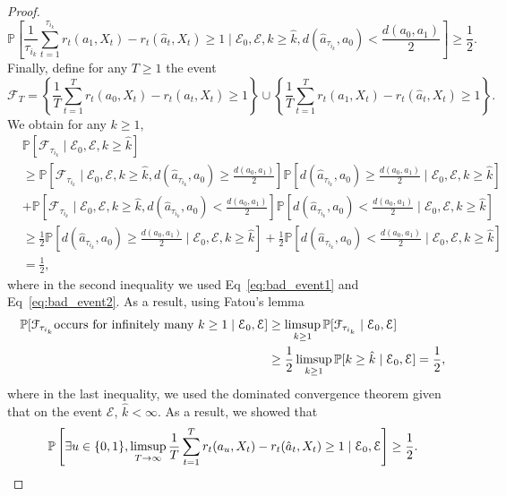 \documentclass[aos]{imsart}
\theoremstyle{plain}
\theoremstyle{remark}
\newcommand{\Ecal}{\mathcal{E}}
\newcommand{\Fcal}{\mathcal{F}}
\newcommand{\Pbb}{\mathbb{P}}
\newcommand{\1}{\mathbbm{1}}%
\renewcommand{\limsup}{\mathop{\rm limsup}}
\begin{document}
\begin{proof}
\begin{equation}\label{eq:bad_event2}
    \Pbb \left[\frac{1}{\tau_{i_k}}\sum_{t=1}^{\tau_{i_k}} r_t(a_1, X_t) - r_t(\hat a_t, X_t) \geq 1 \mid \Ecal_0,\Ecal, k\geq \hat k,d(\hat a_{\tau_{i_k}},a_0) < \frac{d(a_0,a_1)}{2} \right] \geq \frac{1}{2}.
\end{equation}
Finally, define for any $T\geq 1$ the event
\begin{equation*}
    \Fcal_T = \left\{ \frac{1}{T}\sum_{t=1}^T r_t(a_0, X_t) -r_t(\hat a_t, X_t) \geq 1\right\} \cup \left\{\frac{1}{T}\sum_{t=1}^{T} r_t(a_1, X_t) - r_t(\hat a_t, X_t) \geq 1\right\}.
\end{equation*}
We obtain for any $k\geq 1$,
\begin{align*}
    &\Pbb[\Fcal_{\tau_{i_k}}\mid \Ecal_0,\Ecal, k\geq \hat k]\\
    &\geq \Pbb\left[\Fcal_{\tau_{i_k}}\mid \Ecal_0,\Ecal, k\geq \hat k, d(\hat a_{\tau_{i_k}},a_0) \geq \frac{d(a_0,a_1)}{2}\right] \Pbb\left[ d(\hat a_{\tau_{i_k}},a_0) \geq \frac{d(a_0,a_1)}{2}\mid \Ecal_0,\Ecal, k\geq \hat k\right]\\
    &+ \Pbb\left[\Fcal_{\tau_{i_k}}\mid \Ecal_0,\Ecal, k\geq \hat k, d(\hat a_{\tau_{i_k}},a_0) < \frac{d(a_0,a_1)}{2}\right] \Pbb\left[ d(\hat a_{\tau_{i_k}},a_0) < \frac{d(a_0,a_1)}{2}\mid \Ecal_0,\Ecal, k\geq \hat k\right]\\
    &\geq \frac{1}{2} \Pbb\left[ d(\hat a_{\tau_{i_k}},a_0) \geq \frac{d(a_0,a_1)}{2}\mid \Ecal_0,\Ecal, k\geq \hat k\right] +  \frac{1}{2}\Pbb\left[ d(\hat a_{\tau_{i_k}},a_0) < \frac{d(a_0,a_1)}{2}\mid \Ecal_0,\Ecal, k\geq \hat k\right]\\
    &=\frac{1}{2},
\end{align*}
where in the second inequality we used Eq~\eqref{eq:bad_event1} and Eq~\eqref{eq:bad_event2}. As a result, using Fatou's lemma
\begin{align*}
    \Pbb[\Fcal_{\tau_{i_k}} \text{occurs for infinitely many }k\geq 1\mid \Ecal_0,\Ecal] &\geq \limsup_{k\geq 1}\Pbb[\Fcal_{\tau_{i_k}}\mid \Ecal_0,\Ecal] \\
    &\geq \frac{1}{2}\limsup_{k\geq 1}\Pbb[k\geq \hat k\mid \Ecal_0,\Ecal] = \frac{1}{2},
\end{align*}
where in the last inequality, we used the dominated convergence theorem given that on the event $\Ecal$, $\hat k<\infty$. As a result, we showed that
\begin{equation*}
    \Pbb\left[\exists u\in\{0,1\}, \limsup_{T\to\infty}\frac{1}{T}\sum_{t=1}^T r_t(a_u, X_t) - r_t(\hat a_t, X_t) \geq 1 \mid \Ecal_0,\Ecal\right] \geq \frac{1}{2}.

\end{equation*}
\end{proof}
\end{document}
